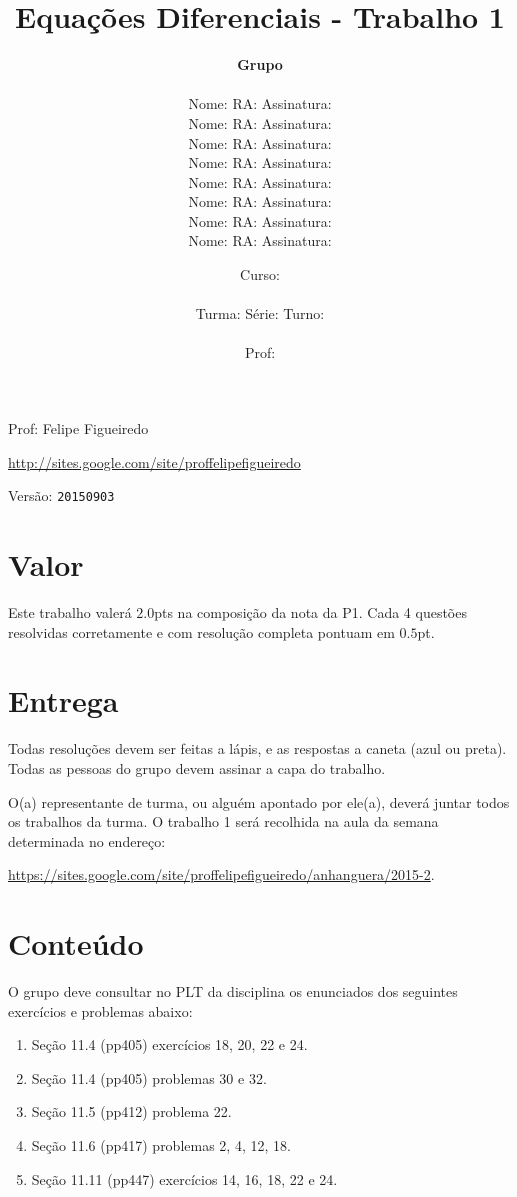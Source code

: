 \documentclass[a4paper]{article}
\date{
\bigskip
Curso: \underline{\hspace{8cm}}\\
\ \\
Turma: \underline{\hspace{1cm}} Série: \underline{\hspace{1cm}} Turno:
\underline{\hspace{1cm}}\\
\ \\
Prof: \underline{\hspace{8cm}}\\
}
\title{Equações Diferenciais - Trabalho 1}
\author{
{\bf Grupo}\\
\ \\
Nome: \underline{\hspace{6cm}} RA: \underline{\hspace{2cm}} Assinatura: \underline{\hspace{4cm}}\\
Nome: \underline{\hspace{6cm}} RA: \underline{\hspace{2cm}} Assinatura: \underline{\hspace{4cm}}\\
Nome: \underline{\hspace{6cm}} RA: \underline{\hspace{2cm}} Assinatura: \underline{\hspace{4cm}}\\
Nome: \underline{\hspace{6cm}} RA: \underline{\hspace{2cm}} Assinatura: \underline{\hspace{4cm}}\\
Nome: \underline{\hspace{6cm}} RA: \underline{\hspace{2cm}} Assinatura: \underline{\hspace{4cm}}\\
Nome: \underline{\hspace{6cm}} RA: \underline{\hspace{2cm}} Assinatura: \underline{\hspace{4cm}}\\
Nome: \underline{\hspace{6cm}} RA: \underline{\hspace{2cm}} Assinatura: \underline{\hspace{4cm}}\\
Nome: \underline{\hspace{6cm}} RA: \underline{\hspace{2cm}} Assinatura: \underline{\hspace{4cm}}\\
}
\begin{document}
\maketitle

\newpage
\parbox[c]{.825\textwidth}{\raggedright%
{Prof: Felipe Figueiredo\par}
{\url{http://sites.google.com/site/proffelipefigueiredo}\par}
}

Versão: \verb|20150903|




\section{Valor}
Este trabalho valerá $2.0$pts na composição da nota da P1. Cada 4
questões resolvidas corretamente e com resolução completa pontuam em
$0.5$pt.

\section{Entrega}

Todas resoluções devem ser feitas a lápis, e as respostas a caneta
(azul ou preta). Todas as pessoas do grupo devem assinar a capa do
trabalho.

O(a) representante de turma, ou alguém apontado por ele(a), deverá
juntar todos os trabalhos da turma. O trabalho 1 será recolhida na
aula da semana determinada no endereço:

\url{https://sites.google.com/site/proffelipefigueiredo/anhanguera/2015-2}.

\section{Conteúdo}

O grupo deve consultar no PLT da disciplina os enunciados dos
seguintes exercícios e problemas abaixo:

\begin{enumerate}
\item Seção 11.4  (pp405) exercícios 18, 20, 22 e 24.
\item Seção 11.4  (pp405) problemas 30 e 32.
\item Seção 11.5  (pp412) problema 22.
\item Seção 11.6  (pp417) problemas 2, 4, 12, 18.
\item Seção 11.11 (pp447) exercícios 14, 16, 18, 22 e 24.
\end{enumerate}
\end{document}
